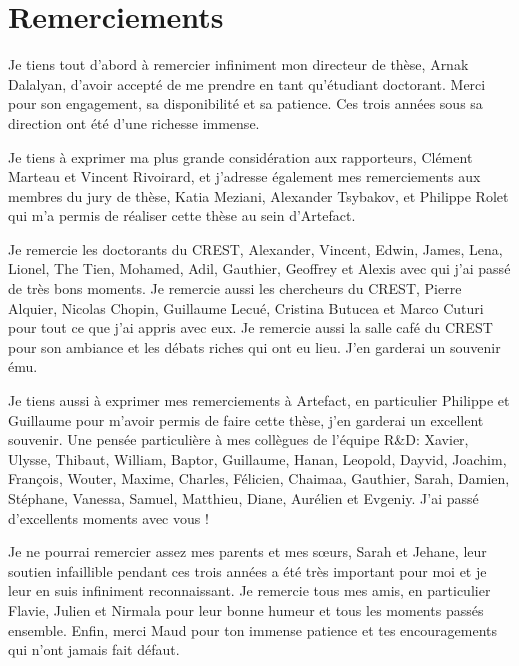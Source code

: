 \chapter*{Remerciements}

Je tiens tout d'abord à remercier infiniment mon directeur de thèse, Arnak Dalalyan, d'avoir accepté de me prendre en tant qu'étudiant doctorant. Merci pour son engagement, sa disponibilité et sa patience. Ces trois années sous sa direction ont été d'une richesse immense.

Je tiens à exprimer ma plus grande considération aux rapporteurs, Clément Marteau et Vincent Rivoirard, et j'adresse également mes remerciements aux membres du jury de thèse, Katia Meziani, Alexander Tsybakov, et Philippe Rolet qui m'a permis de réaliser cette thèse au sein d'Artefact.

Je remercie les doctorants du CREST, Alexander, Vincent, Edwin, James, Lena, Lionel, The Tien, Mohamed, Adil, Gauthier, Geoffrey et Alexis avec qui j'ai passé de très bons moments.
Je remercie aussi les chercheurs du CREST, Pierre Alquier, Nicolas Chopin, Guillaume Lecué, Cristina Butucea et Marco Cuturi pour tout ce que j'ai appris avec eux. Je remercie aussi la salle café du CREST pour son ambiance et les débats riches qui ont eu lieu. J'en garderai un souvenir ému.

Je tiens aussi à exprimer mes remerciements à Artefact, en particulier Philippe et Guillaume pour m'avoir permis de faire cette thèse, j'en garderai un excellent souvenir. Une pensée particulière à mes collègues de l'équipe R\&D: Xavier, Ulysse, Thibaut, William, Baptor, Guillaume, Hanan, Leopold, Dayvid, Joachim, François, Wouter, Maxime, Charles, Félicien, Chaimaa, Gauthier, Sarah, Damien, Stéphane, Vanessa, Samuel, Matthieu, Diane, Aurélien et Evgeniy. J'ai passé d'excellents moments avec vous !

Je ne pourrai remercier assez mes parents et mes sœurs, Sarah et Jehane, leur soutien infaillible pendant ces trois années a été très important pour moi et je leur en suis infiniment reconnaissant.
Je remercie tous mes amis, en particulier Flavie, Julien et Nirmala pour leur bonne humeur et tous les moments passés ensemble.
Enfin, merci Maud pour ton immense patience et tes encouragements qui n'ont jamais fait défaut.
